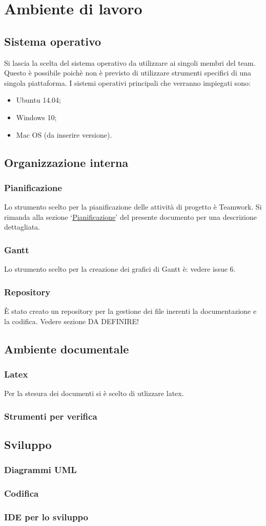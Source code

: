 \documentclass[../NormeProgetto.tex]{subfiles}
\begin{document}
	\section{Ambiente di lavoro}
		\subsection{Sistema operativo}
		Si lascia la scelta del sistema operativo da utilizzare ai singoli membri del team. Questo è possibile poichè non è previsto di utilizzare strumenti specifici di una singola piattaforma. I sistemi operativi principali che verranno impiegati sono:
		\begin{itemize}
			\item Ubuntu 14.04;
			\item Windows 10;
			\item Mac OS (da inserire versione).
		\end{itemize}
		
		\subsection{Organizzazione interna}
			\subsubsection{Pianificazione}
			Lo strumento scelto per la pianificazione delle attività di progetto è Teamwork. Si rimanda alla sezione `\hyperref[sec: Pianificazione Teamwork]{Pianificazione}' del presente documento per una descrizione dettagliata.
			\subsubsection{Gantt}
			Lo strumento scelto per la creazione dei grafici di Gantt è: vedere issue 6.
			\subsubsection{Repository}
			È stato creato un repository per la gestione dei file inerenti la documentazione e la codifica. Vedere sezione DA DEFINIRE!
		\subsection{Ambiente documentale}
			\subsubsection{Latex}
			Per la stesura dei documenti si è scelto di utlizzare latex. 
			\subsubsection{Strumenti per verifica}
		\subsection{Sviluppo}
			\subsubsection{Diagrammi UML}
		\subsubsection{Codifica}
			\subsubsection{IDE per lo sviluppo}
\end{document}
